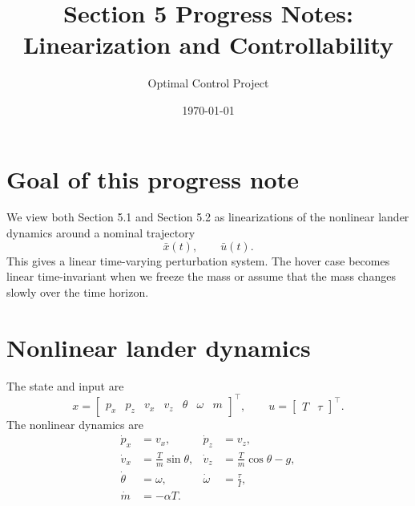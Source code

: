 \documentclass[10pt]{article}
\title{Section 5 Progress Notes: Linearization and Controllability}
\author{Optimal Control Project}
\date{\today}
\newcommand{\ub}{\bar u}
\newcommand{\xb}{\bar x}
\newcommand{\eps}{\omega}
\newcommand{\vphi}{\alpha}
\begin{document}
\maketitle

\section*{Goal of this progress note}
We view both Section 5.1 and Section 5.2 as linearizations of the nonlinear lander dynamics around a nominal trajectory
\[
    \xb(t),\qquad \ub(t).
\]
This gives a linear time-varying perturbation system. The hover case becomes linear time-invariant when we freeze the mass or assume that the mass changes slowly over the time horizon.

\section{Nonlinear lander dynamics}
The state and input are
\[
    x = \begin{bmatrix}p_x & p_z & v_x & v_z & \theta & \eps & m\end{bmatrix}^{\top},
    \qquad
    u = \begin{bmatrix}T & \tau\end{bmatrix}^{\top}.
\]
The nonlinear dynamics are
\begin{align}
    \dot p_x &= v_x, &
    \dot p_z &= v_z, \\
    \dot v_x &= \frac{T}{m}\sin\theta, &
    \dot v_z &= \frac{T}{m}\cos\theta - g, \\
    \dot\theta &= \eps, &
    \dot\eps &= \frac{\tau}{I}, \\
    \dot m &= -\vphi T.
\end{align}
\end{document}
